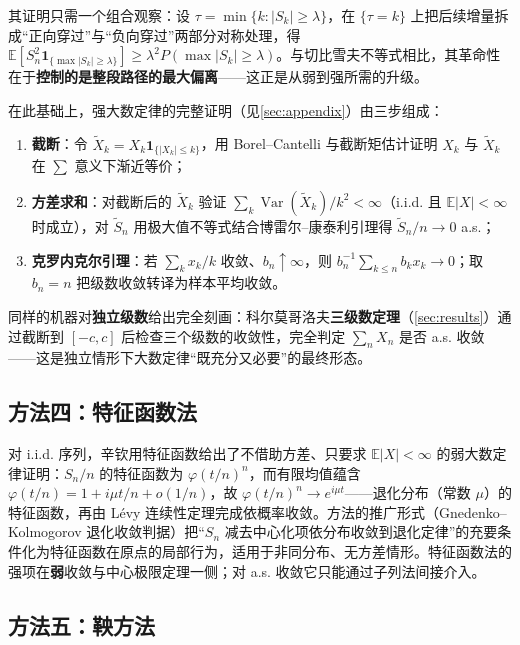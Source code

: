 其证明只需一个组合观察：设 $\tau = \min\{k: |S_k| \geq \lambda\}$，在 $\{\tau = k\}$ 上把后续增量拆成“正向穿过”与“负向穿过”两部分对称处理，得 $\mathbb{E}[S_n^2 \mathbf{1}_{\{\max |S_k| \geq \lambda\}}] \geq \lambda^2 P(\max |S_k| \geq \lambda)$。与切比雪夫不等式相比，其革命性在于\textbf{控制的是整段路径的最大偏离}——这正是从弱到强所需的升级。

在此基础上，强大数定律的完整证明（见\cref{sec:appendix}）由三步组成：

\begin{enumerate}[label=(\arabic*)]
    \item \textbf{截断}：令 $\tilde{X}_k = X_k \mathbf{1}_{\{|X_k| \leq k\}}$，用 Borel--Cantelli 与截断矩估计证明 $X_k$ 与 $\tilde{X}_k$ 在 $\sum$ 意义下渐近等价；
    \item \textbf{方差求和}：对截断后的 $\tilde{X}_k$ 验证 $\sum_k \operatorname{Var}(\tilde{X}_k)/k^2 < \infty$（i.i.d. 且 $\mathbb{E}|X|<\infty$ 时成立），对 $\tilde{S}_n$ 用极大值不等式结合博雷尔--康泰利引理得 $\tilde{S}_n/n \to 0$ a.s.；
    \item \textbf{克罗内克尔引理}：若 $\sum_k x_k / k$ 收敛、$b_n \uparrow \infty$，则 $b_n^{-1}\sum_{k \leq n} b_k x_k \to 0$；取 $b_n = n$ 把级数收敛转译为样本平均收敛。
\end{enumerate}

同样的机器对\textbf{独立级数}给出完全刻画：科尔莫哥洛夫\textbf{三级数定理}（\cref{sec:results}）通过截断到 $[-c, c]$ 后检查三个级数的收敛性，完全判定 $\sum_n X_n$ 是否 a.s. 收敛——这是独立情形下大数定律“既充分又必要”的最终形态。

\subsection{方法四：特征函数法}

对 i.i.d. 序列，辛钦用特征函数给出了不借助方差、只要求 $\mathbb{E}|X| < \infty$ 的弱大数定律证明：$S_n/n$ 的特征函数为 $\varphi(t/n)^n$，而有限均值蕴含 $\varphi(t/n) = 1 + i\mu t/n + o(1/n)$，故 $\varphi(t/n)^n \to e^{i\mu t}$——退化分布（常数 $\mu$）的特征函数，再由 L\'evy 连续性定理完成依概率收敛。方法的推广形式（Gnedenko--Kolmogorov 退化收敛判据）把“$S_n$ 减去中心化项依分布收敛到退化定律”的充要条件化为特征函数在原点的局部行为，适用于非同分布、无方差情形。特征函数法的强项在\textbf{弱}收敛与中心极限定理一侧；对 a.s. 收敛它只能通过子列法间接介入。

\subsection{方法五：鞅方法}

